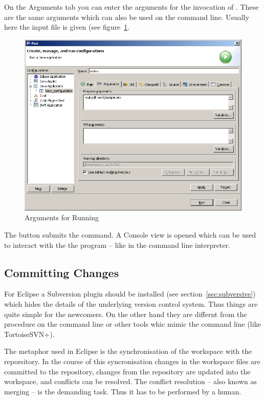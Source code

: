 On the \textsf{Arguments} tab you can enter the arguments for the
invocation of \ExTeX. These are the same arguments which can also be
used on the command line. Usually here the input file is given (see
figure~\ref{fig:eclipse-run-args}.
\begin{figure}[thp]
  \centering
  \includegraphics[scale=.4]{image/eclipse/run-args}
  \caption{Arguments for Running \ExTeX}\label{fig:eclipse-run-args}
\end{figure}

The  button submits the command. A Console view is opened
which can be used to interact with the the program -- like in the
command line interpreter.


\subsection{Committing Changes}

For Eclipse a Subversion plugin should be installed (see
section~\ref{sec:subversive}) which hides the details of the
underlying version control system. Thus things are quite simple for
the newcomers. On the other hand they are differnt from the procedure
on the command line or other tools whic mimic the command line (like
\+TortoiseSVN+).

The metaphor used in Eclipse is the synchronisation of the workspace
with the reporsitory. In the course of this syncronisation changes in
the workspace files are committed to the repository, changes from the
repository are updated into the workspace, and conflicts can be
resolved. The conflict resolution -- also known as merging -- is the
demanding task. Thus it has to be performed by a human.

